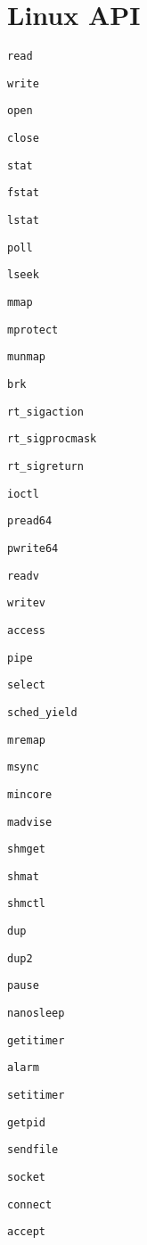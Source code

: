 \chapter{Linux API}

\verb+read+

\verb+write+

\verb+open+

\verb+close+

\verb+stat+

\verb+fstat+

\verb+lstat+

\verb+poll+

\verb+lseek+

\verb+mmap+

\verb+mprotect+

\verb+munmap+

\verb+brk+

\verb+rt_sigaction+

\verb+rt_sigprocmask+

\verb+rt_sigreturn+

\verb+ioctl+

\verb+pread64+

\verb+pwrite64+

\verb+readv+

\verb+writev+

\verb+access+

\verb+pipe+

\verb+select+

\verb+sched_yield+

\verb+mremap+

\verb+msync+

\verb+mincore+

\verb+madvise+

\verb+shmget+

\verb+shmat+

\verb+shmctl+

\verb+dup+

\verb+dup2+

\verb+pause+

\verb+nanosleep+

\verb+getitimer+

\verb+alarm+

\verb+setitimer+

\verb+getpid+

\verb+sendfile+

\verb+socket+

\verb+connect+

\verb+accept+


